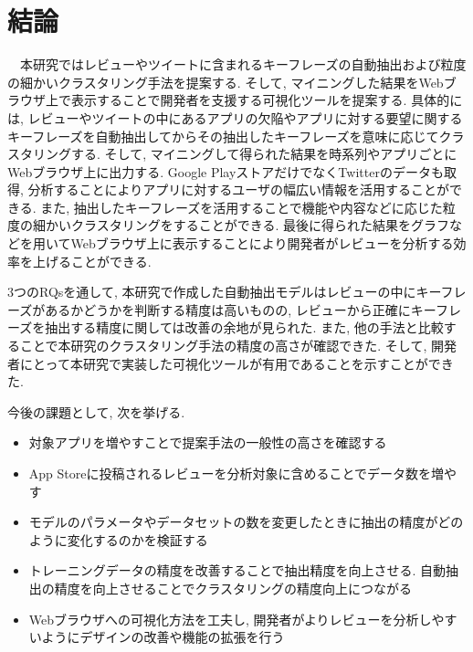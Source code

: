 \chapter{結論}
\label{chap:keturon}

　本研究ではレビューやツイートに含まれるキーフレーズの自動抽出および粒度の細かいクラスタリング手法を提案する. そして, マイニングした結果をWebブラウザ上で表示することで開発者を支援する可視化ツールを提案する. 
具体的には, レビューやツイートの中にあるアプリの欠陥やアプリに対する要望に関するキーフレーズを自動抽出してからその抽出したキーフレーズを意味に応じてクラスタリングする.  そして, マイニングして得られた結果を時系列やアプリごとにWebブラウザ上に出力する.
Google PlayストアだけでなくTwitterのデータも取得, 分析することによりアプリに対するユーザの幅広い情報を活用することができる. また, 抽出したキーフレーズを活用することで機能や内容などに応じた粒度の細かいクラスタリングをすることができる. 最後に得られた結果をグラフなどを用いてWebブラウザ上に表示することにより開発者がレビューを分析する効率を上げることができる. 

3つのRQsを通して, 本研究で作成した自動抽出モデルはレビューの中にキーフレーズがあるかどうかを判断する精度は高いものの, レビューから正確にキーフレーズを抽出する精度に関しては改善の余地が見られた. また, 他の手法と比較することで本研究のクラスタリング手法の精度の高さが確認できた. そして, 開発者にとって本研究で実装した可視化ツールが有用であることを示すことができた. 

今後の課題として, 次を挙げる. 

\begin{itemize}
    \item 対象アプリを増やすことで提案手法の一般性の高さを確認する
    \item App Storeに投稿されるレビューを分析対象に含めることでデータ数を増やす
    \item モデルのパラメータやデータセットの数を変更したときに抽出の精度がどのように変化するのかを検証する
    \item トレーニングデータの精度を改善することで抽出精度を向上させる. 自動抽出の精度を向上させることでクラスタリングの精度向上につながる
    \item Webブラウザへの可視化方法を工夫し, 開発者がよりレビューを分析しやすいようにデザインの改善や機能の拡張を行う
\end{itemize}
